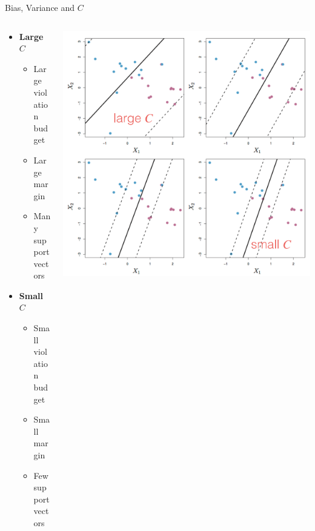 \begin{frame}{Bias, Variance and $C$}
    \begin{columns}
        \begin{column}{0.45\textwidth}
            \begin{itemize}
                \item \textbf{Large $C$}
                \begin{itemize}
                    \item Large violation budget
                    \item Large margin
                    \item Many support vectors
                \end{itemize}
                \vspace{0.5cm}
                \item \textbf{Small $C$}
                \begin{itemize}
                    \item Small violation budget
                    \item Small margin
                    \item Few support vectors
                \end{itemize}
            \end{itemize}
        \end{column}
        \begin{column}{0.55\textwidth}
            \centering
            \includegraphics[width=\textwidth]{images/support-vector-machines/support-vector-machines-14.png}
        \end{column}
    \end{columns}
\end{frame}


